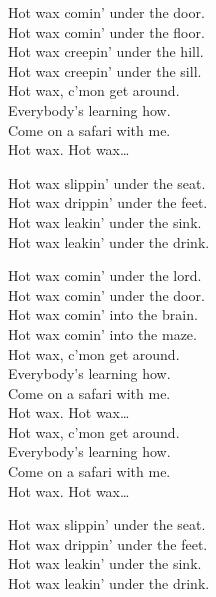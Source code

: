 


Hot wax comin' under the door. \\
Hot wax comin' under the floor. \\
Hot wax creepin' under the hill. \\
Hot wax creepin' under the sill. \\

Hot wax, c'mon get around. \\
Everybody's learning how. \\
Come on a safari with me. \\

Hot wax. Hot wax… \\


Hot wax slippin' under the seat. \\
Hot wax drippin' under the feet. \\
Hot wax leakin' under the sink. \\
Hot wax leakin' under the drink. \\


Hot wax comin' under the lord. \\
Hot wax comin' under the door. \\
Hot wax comin' into the brain. \\
Hot wax comin' into the maze. \\

Hot wax, c'mon get around. \\
Everybody's learning how. \\
Come on a safari with me. \\

Hot wax. Hot wax… \\

Hot wax, c'mon get around. \\
Everybody's learning how. \\
Come on a safari with me. \\

Hot wax. Hot wax… \\


Hot wax slippin' under the seat. \\
Hot wax drippin' under the feet. \\
Hot wax leakin' under the sink. \\
Hot wax leakin' under the drink. \\

